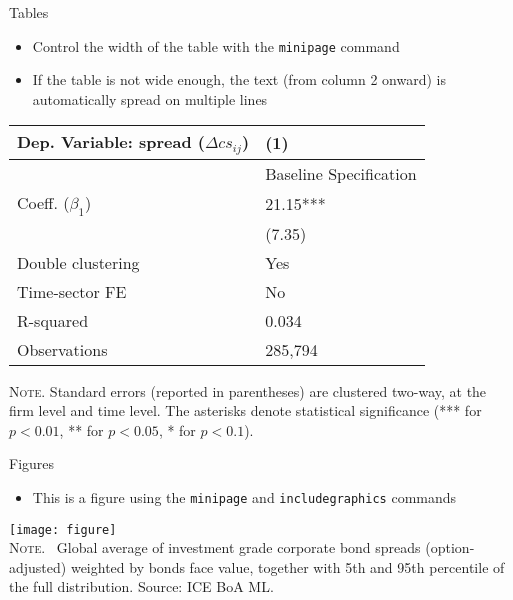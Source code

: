 \documentclass[10pt]{beamer}
\begin{document}
\begin{frame}
	{Tables}
	\begin{itemize}
		\item Control the width of the table with the \texttt{minipage} command \medskip
		\item If the table is not wide enough, the text (from column 2 onward) is automatically spread on multiple lines
	\end{itemize}
	\begin{table}[th]
		\centering%
		\begin{minipage}[b]{.4\textwidth}
			\vspace{.2cm}\tablesize
			\begin{tabularx}{\textwidth}{lY}
				\toprule
				Dep. Variable: spread ($\Delta cs_{ij}$) 	& (1)\\
				\midrule
				& {Baseline Specification} \\
				\midrule
				 Coeff. ($\beta_1$) 		&  21.15*** \\
				&   (7.35) \\
				\midrule
				 Double clustering 		& Yes \\
				Time-sector FE 												& No \\
				 R-squared 					& 0.034 \\
				Observations 												& 285,794 \\\bottomrule
			\end{tabularx}\vspace{.2cm}\newline
			\tiny{{\scshape Note.} Standard errors (reported in parentheses) are clustered two-way, at the firm level and time level. The asterisks denote statistical significance (*** for $p<0.01$, ** for $p<0.05$, * for $p<0.1$).\newline}%
			\label{tab:label}%
		\end{minipage}
	\end{table}
\end{frame}


\begin{frame}
	{Figures}
	\begin{itemize}
		\item This is a figure using the \texttt{minipage} and \texttt{includegraphics} commands
	\end{itemize}
	\begin{center}
		\begin{minipage}[b]{.6\textwidth}
			\texttt{[image: figure]}\\
			\tiny{{\scshape Note}. \ Global average of investment grade corporate bond spreads (option-adjusted) weighted by bonds face value, together with 5th and 95th percentile of the full distribution. Source: ICE BoA ML.}
		\end{minipage}
	\end{center}
\end{frame}
\end{document}
